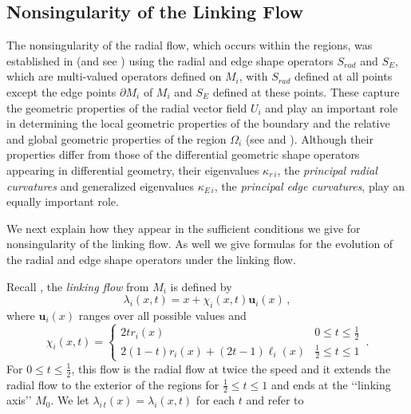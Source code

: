 \documentclass[10pt]{amsart}
\theoremstyle{definition}
\theoremstyle{definition}
\numberwithin{equation}{section}
\def \bu {\mathbf {u}}
\def \gk {\kappa}
\def \gl {\lambda}
\def \gW {\Omega}
\begin{document}
\subsection*{Nonsingularity of the Linking Flow} 
\par
The nonsingularity of the radial flow, which occurs within the regions, 
was established in \cite[\S 4]{D1} (and see \cite[\S 2]{D3}) using the 
radial and edge shape operators $S_{rad}$ and $S_{E}$, which are 
multi-valued operators defined on $M_i$, with $S_{rad}$ defined at all 
points except the edge points $\partial M_i$ of $M_i$ and $S_{E}$ defined 
at these points.  These capture the geometric properties of the radial 
vector field $U_i$ and play an important role in determining the local 
geometric properties of the boundary and the relative and global 
geometric properties of the region $\gW_i$ (see \cite{D2} and \cite[\S 3, 
4]{D3}).  Although their properties differ from those of the differential 
geometric shape operators appearing in differential geometry, their 
eigenvalues $\gk_{r\, i}$, the {\em principal radial curvatures} and 
generalized eigenvalues $\gk_{E\, i}$, the {\em principal edge curvatures}, 
play an equally important role.  \par
We next explain how they appear in the sufficient conditions we give for 
nonsingularity of the linking flow.  As 
well we give formulas for the evolution of the radial and edge shape 
operators under the linking flow.  \par
Recall \cite[(3.1)]{DG1}, the {\it linking flow} from $M_i$ is defined by 
\begin{equation}
\label{Eqn2.1.0}
\gl_{i}(x,t) = x + \chi_i(x,t)\bu_i(x)\, ,
\end{equation}
 where $\bu_i(x)$ ranges over all possible values and
\begin{equation}
\label{Eqn2.1}
\chi_i(x,t) = \left\{      
\begin{array}{lr}       
 2tr_i(x) &  \displaystyle 0 \leq t \leq \frac{1}{2}\\        2(1-t)r_i(x) + 
(2t-1)\ell_i(x) &  \displaystyle \frac{1}{2} \leq t \leq 1      
\end{array}    \right.  \, .
\end{equation}
For $0 \leq t \leq \frac{1}{2}$, this flow is the radial flow at twice the 
speed and it extends the radial flow to the exterior  of the regions for 
$\frac{1}{2} \leq t \leq 1$ and ends at the \lq\lq linking axis\rq\rq 
$M_0$.  We let $\gl_{i\, t}(x) = \gl_i(x ,t)$ for each $t$ and refer to 
\end{document}
